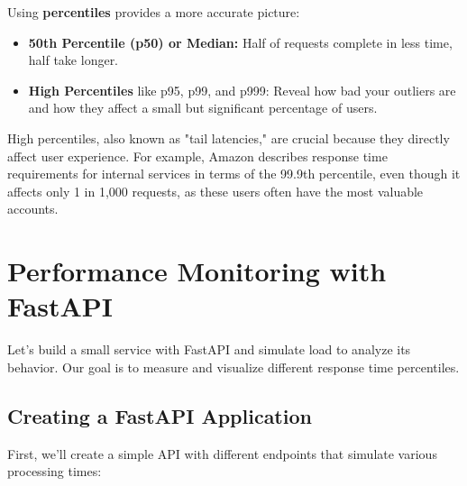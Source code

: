 \documentclass[12pt,letterpaper]{article}
\begin{document}
Using \textbf{\textcolor{accentColor}{percentiles}} provides a more accurate picture:

\begin{itemize}
    \item \textbf{\textcolor{pythonBlue}{50th Percentile (p50) or Median:}} Half of requests complete in less time, half take longer.
    \item \textbf{\textcolor{pythonBlue}{High Percentiles}} like p95, p99, and p999: Reveal how bad your outliers are and how they affect a small but significant percentage of users.
\end{itemize}

High percentiles, also known as "tail latencies," are crucial because they directly affect user experience. For example, Amazon describes response time requirements for internal services in terms of the 99.9th percentile, even though it affects only 1 in 1,000 requests, as these users often have the most valuable accounts.

\section{Performance Monitoring with FastAPI}

Let's build a small service with FastAPI and simulate load to analyze its behavior. Our goal is to measure and visualize different response time percentiles.

\subsection{Creating a FastAPI Application}

First, we'll create a simple API with different endpoints that simulate various processing times:
\end{document}
